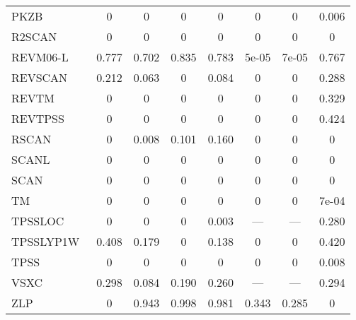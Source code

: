 \begin{table*}
\begin{tabular}{|l|c|c|c|c|c|c|c|}
PKZB~\cite{Perdew1999_2544} & 0 & 0 & 0 & 0 & 0 & 0 & 0.006 \\
R2SCAN~\cite{Furness2020_8208,Furness2020_9248} & 0 & 0 & 0 & 0 & 0 & 0 & 0 \\
REVM06-L~\cite{Wang2017_8487} & 0.777 & 0.702 & 0.835 & 0.783 & 5e-05 & 7e-05 & 0.767 \\
REVSCAN~\cite{Mezei2018_2469} & 0.212 & 0.063 & 0 & 0.084 & 0 & 0 & 0.288 \\
REVTM~\cite{Jana2019_6356} & 0 & 0 & 0 & 0 & 0 & 0 & 0.329 \\
REVTPSS~\cite{Perdew2009_026403,Perdew2011_179902} & 0 & 0 & 0 & 0 & 0 & 0 & 0.424 \\
RSCAN~\cite{Bartok2019_161101} & 0 & 0.008 & 0.101 & 0.160 & 0 & 0 & 0 \\
SCANL~\cite{Mejia2017_052512,Mejia2018_115161,Sun2015_036402} & 0 & 0 & 0 & 0 & 0 & 0 & 0 \\
SCAN~\cite{Sun2015_036402} & 0 & 0 & 0 & 0 & 0 & 0 & 0 \\
TM~\cite{Tao2016_073001} & 0 & 0 & 0 & 0 & 0 & 0 & 7e-04 \\
TPSSLOC~\cite{Constantin2012_035130} & 0 & 0 & 0 & 0.003 & --- & --- & 0.280 \\
TPSSLYP1W~\cite{Dahlke2005_15677} & 0.408 & 0.179 & 0 & 0.138 & 0 & 0 & 0.420 \\
TPSS~\cite{Tao2003_146401,Perdew2004_6898} & 0 & 0 & 0 & 0 & 0 & 0 & 0.008 \\
VSXC~\cite{VanVoorhis1998_400} & 0.298 & 0.084 & 0.190 & 0.260 & --- & --- & 0.294 \\
ZLP~\cite{Zhao1993_918} & 0 & 0.943 & 0.998 & 0.981 & 0.343 & 0.285 & 0 \\
\bottomrule
\end{tabular}
\end{table*}
